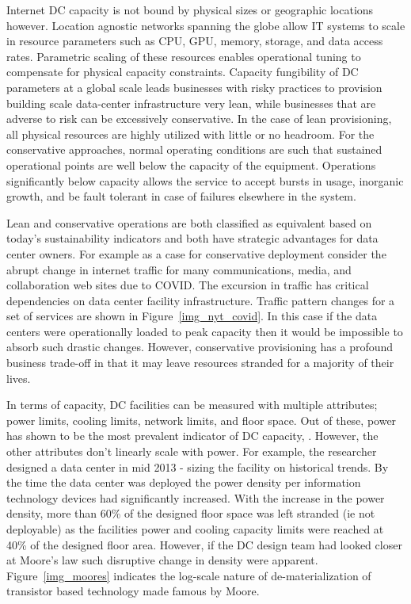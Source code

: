     Internet DC capacity is not bound by physical sizes or geographic locations however. Location agnostic networks spanning the globe allow IT systems to scale in resource parameters such as CPU, GPU, memory, storage, and data access rates. Parametric scaling of these resources enables operational tuning to compensate for physical capacity constraints. Capacity fungibility of DC parameters at a global scale leads businesses with risky practices to provision building scale data-center infrastructure very lean, while businesses that are adverse to risk can be excessively conservative. In the case of lean provisioning, all physical resources are highly utilized with little or no headroom. For the conservative approaches, normal operating conditions are such that sustained operational points are well below the capacity of the equipment. Operations significantly below capacity allows the service to accept bursts in usage, inorganic growth, and be fault tolerant in case of failures elsewhere in the system. 
    
    Lean and conservative operations are both classified as equivalent based on today's sustainability indicators and both have strategic advantages for data center owners. For example as a case for conservative deployment consider the abrupt change in internet traffic for many communications, media, and collaboration web sites due to COVID. The excursion in traffic has critical dependencies on data center facility infrastructure.  Traffic pattern changes for a set of services are shown in Figure~\ref{img_nyt_covid}. In this case if the data centers were operationally loaded to peak capacity then it would be impossible to absorb such drastic changes. However, conservative provisioning has a profound business trade-off in that it may leave resources stranded for a majority of their lives. 
    
    
    
    In terms of capacity, DC facilities can be measured with multiple attributes; power limits, cooling limits, network limits, and floor space. Out of these, power has shown to be the most prevalent indicator of DC capacity, \cite{barroso18}. However, the other attributes don't linearly scale with power. For example, the researcher designed a data center in mid 2013 - sizing the facility on historical trends. By the time the data center was deployed the power density per information technology devices had significantly increased. With the increase in the power density, more than 60\% of the designed floor space was left stranded (ie not deployable) as the facilities power and cooling capacity limits were reached at 40\% of the designed floor area. However, if the DC design team had looked closer at Moore's law such disruptive change in density were apparent. Figure~\ref{img_moores} indicates the log-scale nature of de-materialization of transistor based technology made famous by Moore.
    
